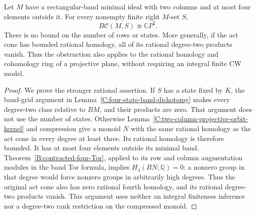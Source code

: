 \begin{theorem}
\label{C:two-column-four-outside-act-cones}
Let $M$ have a rectangular-band minimal ideal with two columns
and at most four elements outside it.  For every nonempty finite
right $M$-set $S$,
\[
 B\mathcal C(M,S)\not\simeq\mathbb CP^2.
\]
There is no bound on the number of rows or states.
More generally, if the act cone has bounded rational homology, all
of its rational degree-two products vanish.  Thus the obstruction
also applies to the rational homology and cohomology ring of a
projective plane, without requiring an integral finite CW model.
\end{theorem}
\begin{proof}
We prove the stronger rational assertion.
If $S$ has a state fixed by $K$, the band-grid argument in
Lemma~\ref{C:four-state-band-dichotomy} makes every degree-two
class relative to $BM$, and their products are zero.  That argument
does not use the number of states.
Otherwise Lemma~\ref{C:two-column-projective-orbit-kernel} and
compression give a monoid $N$ with the same rational homology
as the act cone in every degree at least three.  Its rational
homology is therefore bounded.  It has at most four elements
outside its minimal band.  Theorem~\ref{B:contracted-four-Tor},
applied to its row and column augmentation modules in the band
Tor formula, implies $H_4(BN;\mathbb Q)=0$: a nonzero group in
that degree would force nonzero groups in arbitrarily high degrees.
Thus the original act cone also has zero rational fourth homology,
and its rational degree-two products vanish.  This argument uses
neither an integral finiteness inference nor a degree-two rank
restriction on the compressed monoid.
\end{proof}

